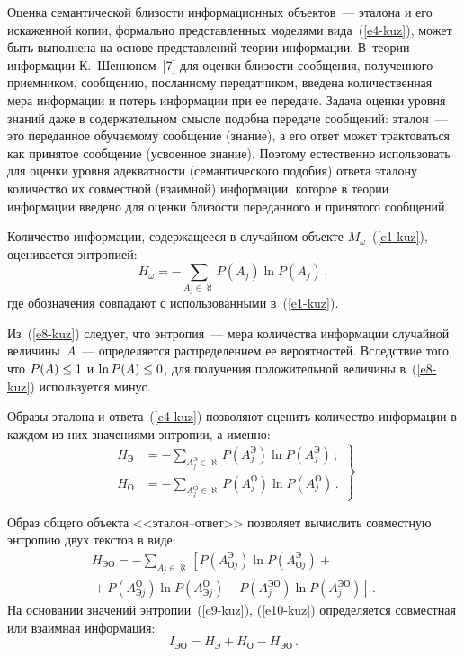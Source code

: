 \begin{multicols}{2}
     Оценка семантической близости информационных объектов~--- эталона и его 
искаженной копии, формально представленных моделями вида~(\ref{e4-kuz}),\linebreak 
может быть выполнена на основе пред\-став\-ле\-ний теории информации. В~тео\-рии 
информации К.~Шенноном~[7] для оценки близости сообщения, полученного 
приемником, сообщению, посланному передатчиком, введена количественная мера 
информации и потерь информации при ее передаче. Задача оценки уровня знаний 
даже в содержательном смысле подобна передаче сообщений: эталон~--- это 
переданное обучаемому сообщение (знание), а его ответ может трактоваться как 
принятое сообщение (усвоенное знание). Поэтому естественно использовать для 
оценки уровня адекватности (семантического подобия) ответа эталону количество 
их совместной (взаимной) информации, которое в теории информации введено для 
оценки близости переданного и принятого сообщений. 
     
     Количество информации, содержащееся в случайном объекте 
$M_\omega$~(\ref{e1-kuz}), оценивается энтропией: 
     \begin{equation}
     H_\omega=-\sum\limits_{A_j\in \aleph} P(A_j)\ln P(A_j)\,,
     \label{e8-kuz}
     \end{equation}
где обозначения совпадают с использованными в~(\ref{e1-kuz}). 

     Из~(\ref{e8-kuz}) следует, что энтропия~--- мера количества информации 
случайной величины~$A$~--- определяется распределением ее вероятностей. 
Вследствие того, что $P(A)\hm\leq1$ и $\ln P(A)\hm\leq0$, для получения 
положительной величины в~(\ref{e8-kuz}) используется минус. 
     
     Образы эталона и ответа~(\ref{e4-kuz}) позволяют оценить количество 
информации в каждом из них значениями энтропии, а именно: 
     \begin{equation}
     \left.
     \begin{array}{rl}
     H_{\mathrm{Э}}&=-\sum\limits_{A_j^{\mathrm{Э}}\in \aleph} 
P(A_j^{\mathrm{Э}}) \ln P(A_j^{\mathrm{Э}})\,;\\[9pt]
     H_{\mathrm{О}}&=-\sum\limits_{A_j^{\mathrm{О}}\in \aleph} 
P(A_j^{\mathrm{О}}) \ln P(A_j^{\mathrm{О}})\,.
\end{array}
\right\}
     \label{e9-kuz}
     \end{equation}

Образ общего объекта <<эта\-лон--от\-вет>> позволяет вычислить совместную 
энтропию двух текстов в виде:
\begin{multline}
H_{\mathrm{ЭО}}=-\sum\limits_{A_j\in\aleph} \left[ 
P(A^{\mathrm{Э}}_{\mathrm{О}j})\ln P(A^{\mathrm{Э}}_{\mathrm{О}j})+{}\right.\\
\left.{}+
P(A^{\mathrm{О}}_{\mathrm{Э}j})\ln P(A^{\mathrm{О}}_{\mathrm{Э}j})-
P(A_j^{\mathrm{ЭО}})\ln P(A_j^{\mathrm{ЭО}})\right]\,.
\label{e10-kuz}
\end{multline}
На основании значений энтропии~(\ref{e9-kuz}), (\ref{e10-kuz}) определяется 
совместная или взаимная информация: 
\begin{equation}
I_{\mathrm{ЭО}}=H_{\mathrm{Э}}+H_{\mathrm{О}}-H_{\mathrm{ЭО}}\,.
\label{e11-kuz}
\end{equation}
     

\end{multicols}
